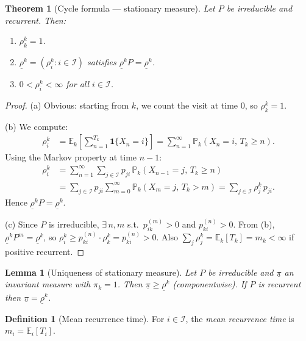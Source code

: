\documentclass[12pt, a4paper]{article}
\theoremstyle{definition}
\newtheorem{definition}{Definition}[section]
\theoremstyle{plain}
\newtheorem{theorem}{Theorem}[section]
\newtheorem{lemma}{Lemma}[section]
\newcommand{\PP}{\mathbb{P}}
\newcommand{\EE}{\mathbb{E}}
\newcommand{\II}{\mathcal{I}}
\begin{document}
\begin{theorem}[Cycle formula — stationary measure]
Let $P$ be irreducible and recurrent. Then:
\begin{enumerate}[label=(\alph*)]
  \item $\rho_k^k = 1$.
  \item $\underline{\rho}^k = (\rho_i^k : i \in \II)$ satisfies $\underline{\rho}^k P = \underline{\rho}^k$.
  \item $0 < \rho_i^k < \infty$ for all $i \in \II$.
\end{enumerate}
\end{theorem}

\begin{proof}
(a) Obvious: starting from $k$, we count the visit at time 0, so $\rho_k^k = 1$.

(b) We compute:
\begin{align*}
  \rho_i^k &= \EE_k\!\left[\sum_{n=1}^{T_k} \mathbf{1}\{X_n = i\}\right]
  = \sum_{n=1}^{\infty} \PP_k(X_n = i,\, T_k \ge n).
\end{align*}
Using the Markov property at time $n-1$:
\begin{align*}
  \rho_i^k &= \sum_{n=1}^{\infty}\sum_{j \in \II} p_{ji}\, \PP_k(X_{n-1}=j,\, T_k \ge n) \\
  &= \sum_{j \in \II} p_{ji}\sum_{m=0}^{\infty} \PP_k(X_m = j,\, T_k > m)
  = \sum_{j \in \II} \rho_j^k\, p_{ji}.
\end{align*}
Hence $\underline{\rho}^k P = \underline{\rho}^k$.

(c) Since $P$ is irreducible, $\exists\, n,m$ s.t.\ $p_{ik}^{(m)} > 0$ and $p_{ki}^{(n)} > 0$. From (b), $\underline{\rho}^k P^m = \underline{\rho}^k$, so $\rho_i^k \ge p_{ki}^{(n)}\cdot \rho_k^k = p_{ki}^{(n)} > 0$. Also $\sum_j \rho_j^k = \EE_k[T_k] = m_k < \infty$ if positive recurrent.
\end{proof}

\begin{lemma}[Uniqueness of stationary measure]
Let $P$ be irreducible and $\underline{\pi}$ an invariant measure with $\pi_k = 1$. Then $\underline{\pi} \ge \underline{\rho}^k$ (componentwise). If $P$ is recurrent then $\underline{\pi} = \underline{\rho}^k$.
\end{lemma}

\begin{definition}[Mean recurrence time]
For $i \in \II$, the \emph{mean recurrence time} is $m_i = \EE_i[T_i]$.
\end{definition}
\end{document}
